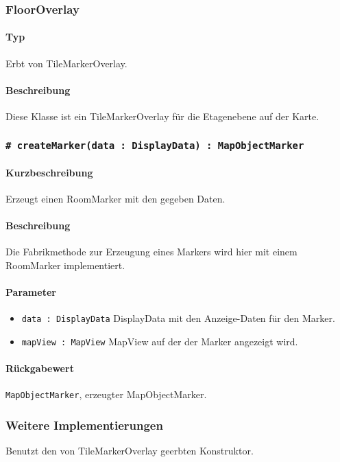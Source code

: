 \subsubsection{FloorOverlay}
\paragraph*{Typ}
Erbt von TileMarkerOverlay.
\paragraph*{Beschreibung}
Diese Klasse ist ein TileMarkerOverlay für die Etagenebene auf der Karte.

\subsubsection*{\texttt{\# createMarker(data : DisplayData) : MapObjectMarker}}%
\paragraph*{Kurzbeschreibung}
Erzeugt einen RoomMarker mit den gegeben Daten.
\paragraph*{Beschreibung}
Die Fabrikmethode zur Erzeugung eines Markers wird hier mit einem RoomMarker implementiert.
\paragraph*{Parameter}
\begin{itemize}
    \item \texttt{data : DisplayData} DisplayData mit den Anzeige-Daten für den Marker.
    \item \texttt{mapView : MapView} MapView auf der der Marker angezeigt wird.
\end{itemize}
\paragraph*{Rückgabewert}
\texttt{MapObjectMarker}, erzeugter MapObjectMarker.

\subsubsection*{Weitere Implementierungen}%
Benutzt den von TileMarkerOverlay geerbten Konstruktor.